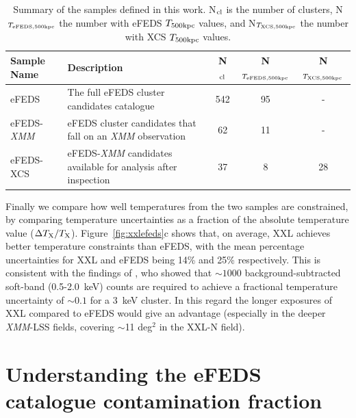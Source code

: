 \documentclass[fleqn,usenatbib]{mnras}
\begin{document}
\begin{table}
\begin{center}
\caption[]{{Summary of the samples defined in this work. N$_{\rm{cl}}$ is the number of clusters, N$_{T_{\rm{eFEDS, 500kpc}}}$ the number with eFEDS $T_{\rm{500kpc}}$ values, and N$_{T_{\rm{XCS, 500kpc}}}$ the number with XCS $T_{\rm{500kpc}}$ values.}\label{tab:samples}}
\vspace{1mm}
\begin{tabular}{l|lccc}
\hline
\hline
Sample Name & Description & N$_{\rm{cl}}$ & N$_{T_{\rm{eFEDS, 500kpc}}}$ & N$_{T_{\rm{XCS, 500kpc}}}$\\
\hline
\hline
eFEDS & The full eFEDS cluster candidates catalogue & 542 & 95 & - \\
\hline
eFEDS-{\em XMM} & eFEDS cluster candidates that fall on an {\em XMM} observation & 62 & 11 & - \\
\hline
eFEDS-XCS & eFEDS-{\em XMM} candidates available for analysis after inspection & 37 & 8 & 28 \\
\hline
\end{tabular}
\end{center}
\end{table}

%

Finally we compare how well temperatures from the two samples are constrained, by comparing temperature uncertainties as a fraction of the absolute temperature value ($\Delta T_{\rm{X}}/T_{\rm{X}}$). Figure~\ref{fig:xxlefeds}c shows that, on average, XXL achieves better temperature constraints than eFEDS, with the mean percentage uncertainties for XXL and eFEDS being 14\% and 25\% respectively. This is consistent with the findings of \cite{xcsmethod}, who showed that ${\sim}1000$ background-subtracted soft-band (0.5-2.0~keV) counts are required to achieve a fractional temperature uncertainty of ${\sim}0.1$ for a 3~keV cluster. In this regard the longer exposures of XXL compared to eFEDS would give an advantage (especially in the deeper {\em XMM}-LSS fields, covering ${\sim}$11 deg$^{2}$ in the XXL-N field). 



\section{Understanding the \lowercase{e}FEDS catalogue contamination fraction}
\end{document}
